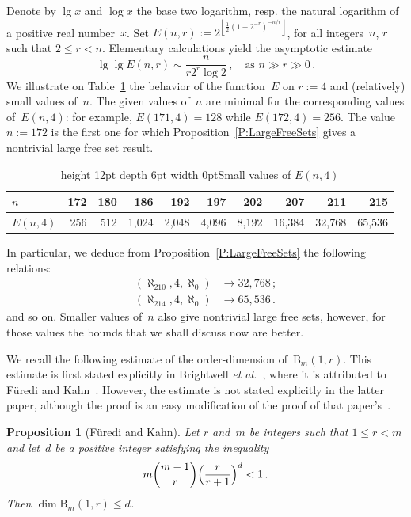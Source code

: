 \documentclass[psamsfonts,reqno]{amsart}
\theoremstyle{plain}
\newtheorem{proposition}[lemma]{Proposition}
\theoremstyle{definition}
\theoremstyle{remark}
\numberwithin{equation}{section}
\numberwithin{figure}{section}
\newcommand{\tvi}{\vrule height 12pt depth 6pt width 0pt}
\newcommand{\intgr}[1]{\left\lfloor{#1}\right\rfloor}
\newcommand{\rB}{\mathrm{B}}
\begin{document}
Denote by $\lg x$ and $\log x$ the base two logarithm, resp. the natural logarithm of a positive real number~$x$. Set $E(n,r):=2^{\intgr{\frac{1}{2}(1-2^{-r})^{-n/r}}}$, for all integers~$n$, $r$ such that $2\leq r<n$. Elementary calculations yield the asymptotic estimate
 \[
 \lg\lg E(n,r)\sim \frac{n}{r2^r\log 2}\,,\quad
 \text{as }n\gg r\gg 0\,.
 \]
We illustrate on Table~\ref{Ta:SmallE} the behavior of the function~$E$ on $r:=4$ and (relatively) small values of~$n$. The given values of~$n$ are minimal for the corresponding values of~$E(n,4)$: for example, $E(171,4)=128$ while $E(172,4)=256$. The value $n:=172$ is the first one for which Proposition~\ref{P:LargeFreeSets} gives a nontrivial large free set result.

\begin{table}
\begin{tabular}{|| l || r | r | r | r | r | r | r | r | r ||}
\hline
$n$ & 172 & 180 & 186 & 192 & 197 & 202 & 207 & 211 & 215\\ \hline
$E(n,4)$ & 256 & 512 & 1,024 & 2,048 & 4,096 & 8,192 & 16,384 & 32,768 & 65,536\\ \hline
\end{tabular}
\caption{\tvi Small values of $E(n,4)$}\label{Ta:SmallE}
\end{table}
In particular, we deduce from Proposition~\ref{P:LargeFreeSets} the following relations:
 \begin{align*}
 (\aleph_{210},4,\aleph_0)&\rightarrow 32{,}768\,;\\
 (\aleph_{214},4,\aleph_0)&\rightarrow 65{,}536\,.
 \end{align*}
and so on. Smaller values of~$n$ also give nontrivial large free sets, however, for those values the bounds that we shall discuss now are better.

We recall the following estimate of the order-dimension of~$\rB_m(1,r)$. This estimate is first stated explicitly in Brightwell \emph{et al.}~\cite[Proposition~1.5]{BKKT94}, where it is attributed to F\"uredi and Kahn~\cite{FuKa86}. However, the estimate is not stated explicitly in the latter paper, although the proof is an easy modification of the proof of that paper's~\cite[Proposition~2.3]{FuKa86}.

\begin{proposition}[F\"uredi and Kahn]\label{P:FuKa}
Let $r$ and~$m$ be integers such that $1\leq r<m$ and let~$d$ be a positive integer satisfying the inequality
 \[
 m\binom{m-1}{r}\Bigl(\frac{r}{r+1}\Bigr)^d<1\,.
 \]
Then $\dim\rB_m(1,r)\leq d$.
\end{proposition}
\end{document}
